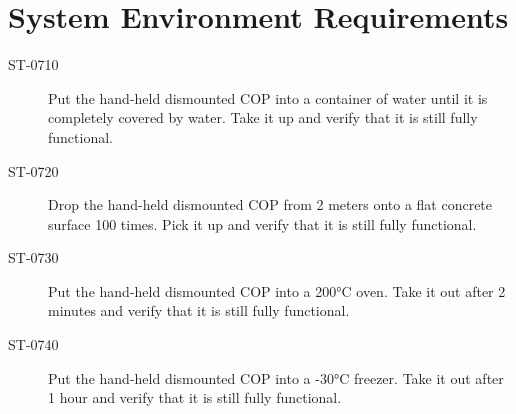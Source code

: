 \section{System Environment Requirements}


\begin{description}
\item[ST-0710] Put the hand-held dismounted COP into a container of water until it is completely covered by water. Take it up and verify that it is still fully functional. 
\item[ST-0720]Drop the hand-held dismounted COP from 2 meters onto a flat concrete surface 100 times. Pick it up and verify that it is still fully functional. 
\item[ST-0730] Put the hand-held dismounted COP into a 200°C oven. Take it out after 2 minutes and verify that it is still fully functional.
\item[ST-0740] Put the hand-held dismounted COP into a -30°C freezer. Take it out after 1 hour and verify that it is still fully functional. 
\end{description}
